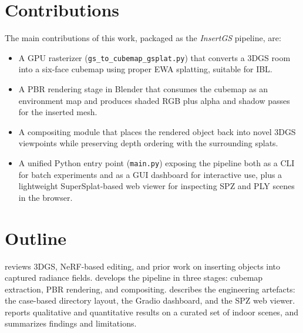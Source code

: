 \section{Contributions}

The main contributions of this work, packaged as the \emph{InsertGS}
pipeline, are:

\begin{itemize}
  \item A GPU rasterizer (\texttt{gs\_to\_cubemap\_gsplat.py}) that converts
        a 3DGS room into a six-face cubemap using proper \ac{EWA}
        splatting, suitable for \ac{IBL}.
  \item A \ac{PBR} rendering stage in Blender that consumes the cubemap as
        an environment map and produces shaded RGB plus alpha and shadow
        passes for the inserted mesh.
  \item A compositing module that places the rendered object back into
        novel 3DGS viewpoints while preserving depth ordering with the
        surrounding splats.
  \item A unified Python entry point (\texttt{main.py}) exposing the
        pipeline both as a \ac{CLI} for batch experiments and as a
        \ac{GUI} dashboard for interactive use, plus a lightweight
        SuperSplat-based web viewer for inspecting \ac{SPZ} and \ac{PLY}
        scenes in the browser.
\end{itemize}

\section{Outline}

 reviews 3DGS, NeRF-based editing, and prior work on
inserting objects into captured radiance fields. 
develops the pipeline in three stages: cubemap extraction, PBR rendering,
and compositing.  describes the engineering
artefacts: the case-based directory layout, the Gradio dashboard, and the
SPZ web viewer.  reports qualitative and quantitative
results on a curated set of indoor scenes, and
 summarizes findings and limitations.
